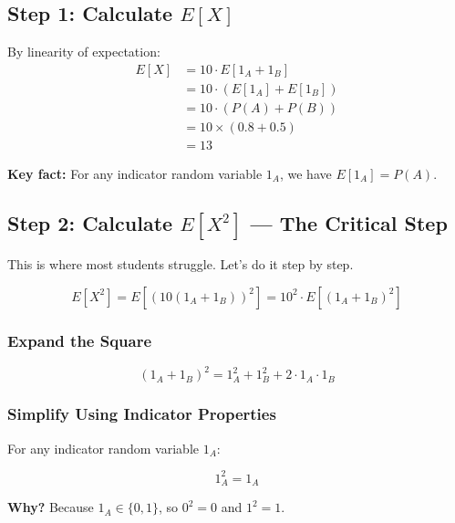 \documentclass[11pt]{article}
\begin{document}
\subsection{Step 1: Calculate $E[X]$}

By linearity of expectation:
\begin{align}
E[X] &= 10 \cdot E[1_A + 1_B]\\
&= 10 \cdot (E[1_A] + E[1_B])\\
&= 10 \cdot (P(A) + P(B))\\
&= 10 \times (0.8 + 0.5)\\
&= 13
\end{align}

\textbf{Key fact:} For any indicator random variable $1_A$, we have $E[1_A] = P(A)$.

\subsection{Step 2: Calculate $E[X^2]$ --- The Critical Step}

This is where most students struggle. Let's do it step by step.

\begin{equation}
E[X^2] = E\left[(10(1_A + 1_B))^2\right] = 10^2 \cdot E\left[(1_A + 1_B)^2\right]
\end{equation}

\subsubsection{Expand the Square}

\begin{tcolorbox}[colback=yellow!10!white,colframe=orange!75!black,title=Key Algebraic Step]
\begin{equation}
(1_A + 1_B)^2 = 1_A^2 + 1_B^2 + 2 \cdot 1_A \cdot 1_B
\end{equation}
\end{tcolorbox}

\subsubsection{Simplify Using Indicator Properties}

For any indicator random variable $1_A$:
\begin{tcolorbox}[colback=blue!5!white,colframe=blue!75!black,title=Important Property]
\begin{equation}
1_A^2 = 1_A
\end{equation}

\textbf{Why?} Because $1_A \in \{0, 1\}$, so $0^2 = 0$ and $1^2 = 1$.
\end{tcolorbox}
\end{document}
